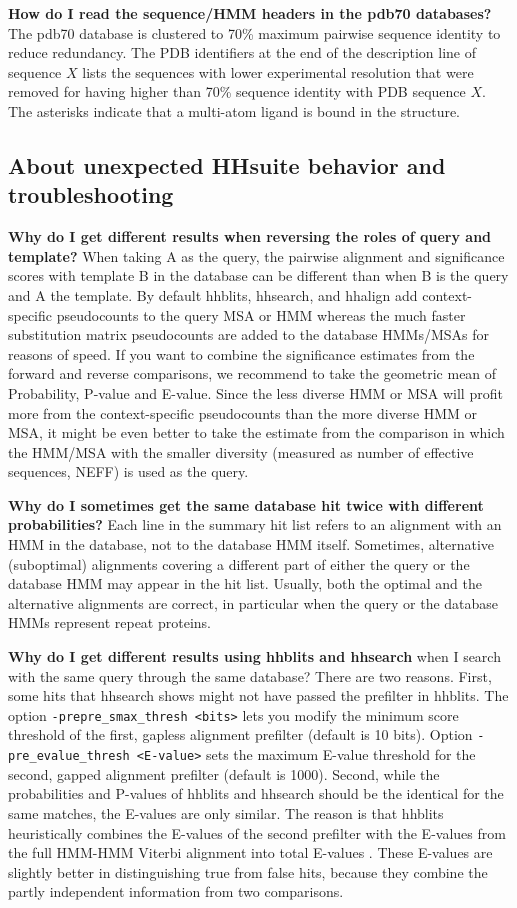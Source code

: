 \documentclass[11pt,a4paper]{article}
\begin{document}
{\bf How do I read the sequence/HMM headers in the pdb70 databases?}
The pdb70 database is clustered to 70\% maximum pairwise sequence identity to reduce redundancy. The PDB identifiers at the end of the description line of sequence $X$ lists the sequences with lower experimental resolution that were removed for having higher than 70\% sequence identity with PDB sequence $X$. The asterisks indicate that a multi-atom ligand is bound in the structure. 


\subsection{About unexpected HHsuite behavior and troubleshooting}

{\bf Why do I get different results when reversing the roles of query and template?} When taking A as the query, the pairwise alignment and significance scores with template B in the database can be different than when B is the query and A the template. By default hhblits, hhsearch, and hhalign add context-specific pseudocounts to the query MSA or HMM whereas the much faster substitution matrix pseudocounts are added to the database HMMs/MSAs for reasons of speed. If you want to combine the significance estimates from the forward and reverse comparisons, we recommend to take the geometric mean of Probability, P-value and E-value. Since the less diverse HMM or MSA will profit more from the context-specific pseudocounts than the more diverse HMM or MSA, it might be even better to take the estimate from the comparison in which the HMM/MSA with the smaller diversity (measured as number of effective sequences, NEFF) is used as the query. 

{\bf Why do I sometimes get the same database hit twice with different probabilities?} Each line in the summary hit list refers to an alignment with an HMM in the database, not to the database HMM itself. Sometimes, alternative (suboptimal) alignments covering a different part of either the query or the database HMM may appear in the hit list. Usually, both the optimal and the alternative alignments are correct, in particular when the query or the database HMMs represent repeat proteins. 

{\bf Why do I get different results using hhblits and hhsearch} when I search with the same query through the same database? There are two reasons. First, some hits that hhsearch shows might not have passed the prefilter in hhblits. The option \verb`-prepre_smax_thresh <bits>` lets you modify the minimum score threshold of the first, gapless alignment prefilter (default is 10 bits). Option \verb`-pre_evalue_thresh <E-value>` sets the maximum E-value threshold for the second, gapped alignment prefilter (default is 1000). Second, while the probabilities and P-values of hhblits and hhsearch should be the identical for the same matches, the E-values are only similar. The reason is that hhblits heuristically combines the E-values of the second prefilter with the E-values from the full HMM-HMM Viterbi alignment into total E-values \cite{Remmert:2011}. These E-values are slightly better in distinguishing true from false hits, because they combine the partly independent information from two comparisons.
\end{document}
